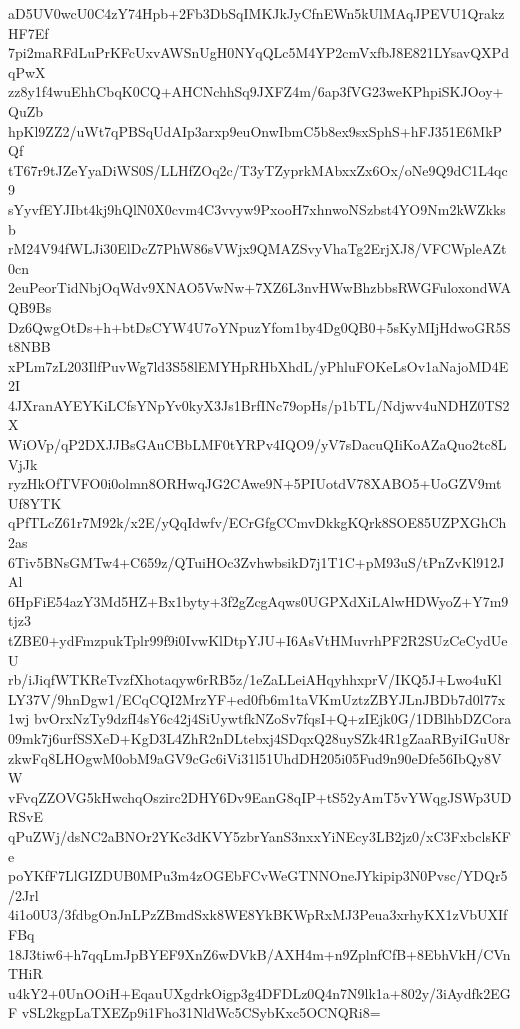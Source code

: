 aD5UV0wcU0C4zY74Hpb+2Fb3DbSqIMKJkJyCfnEWn5kUlMAqJPEVU1QrakzHF7Ef
7pi2maRFdLuPrKFcUxvAWSnUgH0NYqQLc5M4YP2cmVxfbJ8E821LYsavQXPdqPwX
zz8y1f4wuEhhCbqK0CQ+AHCNchhSq9JXFZ4m/6ap3fVG23weKPhpiSKJOoy+QuZb
hpKl9ZZ2/uWt7qPBSqUdAIp3arxp9euOnwIbmC5b8ex9sxSphS+hFJ351E6MkPQf
tT67r9tJZeYyaDiWS0S/LLHfZOq2c/T3yTZyprkMAbxxZx6Ox/oNe9Q9dC1L4qc9
sYyvfEYJIbt4kj9hQlN0X0cvm4C3vvyw9PxooH7xhnwoNSzbst4YO9Nm2kWZkksb
rM24V94fWLJi30ElDcZ7PhW86sVWjx9QMAZSvyVhaTg2ErjXJ8/VFCWpleAZt0cn
2euPeorTidNbjOqWdv9XNAO5VwNw+7XZ6L3nvHWwBhzbbsRWGFuloxondWAQB9Bs
Dz6QwgOtDs+h+btDsCYW4U7oYNpuzYfom1by4Dg0QB0+5sKyMIjHdwoGR5St8NBB
xPLm7zL203IlfPuvWg7ld3S58lEMYHpRHbXhdL/yPhluFOKeLsOv1aNajoMD4E2I
4JXranAYEYKiLCfsYNpYv0kyX3Js1BrfINc79opHs/p1bTL/Ndjwv4uNDHZ0TS2X
WiOVp/qP2DXJJBsGAuCBbLMF0tYRPv4IQO9/yV7sDacuQIiKoAZaQuo2tc8LVjJk
ryzHkOfTVFO0i0olmn8ORHwqJG2CAwe9N+5PIUotdV78XABO5+UoGZV9mtUf8YTK
qPfTLcZ61r7M92k/x2E/yQqIdwfv/ECrGfgCCmvDkkgKQrk8SOE85UZPXGhCh2as
6Tiv5BNsGMTw4+C659z/QTuiHOc3ZvhwbsikD7j1T1C+pM93uS/tPnZvKl912JAl
6HpFiE54azY3Md5HZ+Bx1byty+3f2gZcgAqws0UGPXdXiLAlwHDWyoZ+Y7m9tjz3
tZBE0+ydFmzpukTplr99f9i0IvwKlDtpYJU+I6AsVtHMuvrhPF2R2SUzCeCydUeU
rb/iJiqfWTKReTvzfXhotaqyw6rRB5z/1eZaLLeiAHqyhhxprV/IKQ5J+Lwo4uKl
LY37V/9hnDgw1/ECqCQI2MrzYF+ed0fb6m1taVKmUztzZBYJLnJBDb7d0l77x1wj
bvOrxNzTy9dzfI4sY6c42j4SiUywtfkNZoSv7fqsI+Q+zIEjk0G/1DBlhbDZCora
09mk7j6urfSSXeD+KgD3L4ZhR2nDLtebxj4SDqxQ28uySZk4R1gZaaRByiIGuU8r
zkwFq8LHOgwM0obM9aGV9cGc6iVi31l51UhdDH205i05Fud9n90eDfe56IbQy8VW
vFvqZZOVG5kHwchqOszirc2DHY6Dv9EanG8qIP+tS52yAmT5vYWqgJSWp3UDRSvE
qPuZWj/dsNC2aBNOr2YKc3dKVY5zbrYanS3nxxYiNEcy3LB2jz0/xC3FxbclsKFe
poYKfF7LlGIZDUB0MPu3m4zOGEbFCvWeGTNNOneJYkipip3N0Pvsc/YDQr5/2Jrl
4i1o0U3/3fdbgOnJnLPzZBmdSxk8WE8YkBKWpRxMJ3Peua3xrhyKX1zVbUXIfFBq
18J3tiw6+h7qqLmJpBYEF9XnZ6wDVkB/AXH4m+n9ZplnfCfB+8EbhVkH/CVnTHiR
u4kY2+0UnOOiH+EqauUXgdrkOigp3g4DFDLz0Q4n7N9lk1a+802y/3iAydfk2EGF
vSL2kgpLaTXEZp9i1Fho31NldWc5CSybKxc5OCNQRi8=
